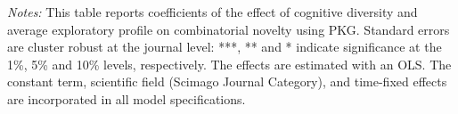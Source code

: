 \begin{table}[h!]
{\begin{threeparttable}
\begin{tabular}{@{\extracolsep{20pt}}lD{.}{.}{-3} D{.}{.}{-3} D{.}{.}{-3} D{.}{.}{-3} }
\end{tabular} 
\begin{tablenotes}
 \footnotesize
 \justifying \item {\it Notes:}
 This table reports coefficients of the effect of cognitive diversity and average exploratory profile on combinatorial novelty using PKG. Standard errors are cluster robust at the journal level: ***, ** and * indicate significance at the 1\%, 5\% and 10\% levels, respectively. The effects are estimated with an OLS. The constant term, scientific field (Scimago Journal Category), and time-fixed effects are incorporated in all model specifications.
 \end{tablenotes}
 \end{threeparttable}
 }
\end{table} 